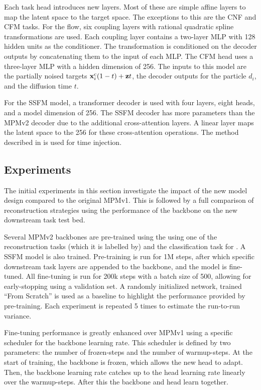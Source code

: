 Each task head introduces new layers.
Most of these are simple affine layers to map the latent space to the target space.
The exceptions to this are the CNF and CFM tasks.
For the flow, six coupling layers with rational quadratic spline transformations are used.
Each coupling layer contains a two-layer MLP with 128 hidden units as the conditioner.
The transformation is conditioned on the decoder outputs by concatenating them to the input of each MLP.
The CFM head uses a three-layer MLP with a hidden dimension of 256.
The inputs to this model are the partially noised targets ${\mathbf{x}^\text{c}_i}(1 - t) + \mathbf{z} t$, the decoder outputs for the particle $d_i$, and the diffusion time $t$.

For the SSFM model, a transformer decoder is used with four layers, eight heads, and a model dimension of 256.
The SSFM decoder has more parameters than the MPMv2 decoder due to the additional cross-attention layers.
A linear layer maps the latent space to the 256 for these cross-attention operations.
The method described in \textcite{DIT} is used for time injection.

\subsection{Experiments}
\label{sec:mpm2_experiments}

The initial experiments in this section investigate the impact of the new model design compared to the original MPMv1.
This is followed by a full comparison of reconstruction strategies using the performance of the backbone on the new downstream task test bed.

Several MPMv2 backbones are pre-trained using the using one of the \xc reconstruction tasks (which it is labelled by) and the classification task for \xid.
A SSFM model is also trained.
Pre-training is run for 1M steps, after which specific downstream task layers are appended to the backbone, and the model is fine-tuned.
All fine-tuning is run for 200k steps with a batch size of 500, allowing for early-stopping using a validation set.
A randomly initialized network, trained ``From Scratch'' is used as a baseline to highlight the performance provided by pre-training.
Each experiment is repeated 5 times to estimate the run-to-run variance.

Fine-tuning performance is greatly enhanced over MPMv1 using a specific scheduler for the backbone learning rate.
This scheduler is defined by two parameters: the number of frozen-steps and the number of warmup-steps.
At the start of training, the backbone is frozen, which allows the new head to adapt.
Then, the backbone learning rate catches up to the head learning rate linearly over the warmup-steps.
After this the backbone and head learn together.

